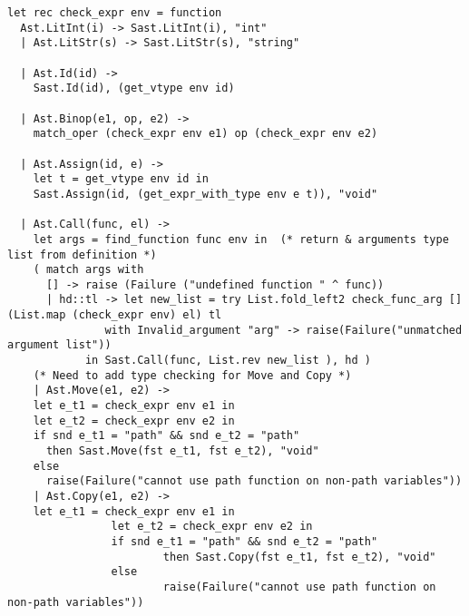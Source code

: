 \documentclass[11pt]{article}
\begin{document}
\begin{listing}[H]
\begin{verbatim}
let rec check_expr env = function
  Ast.LitInt(i) -> Sast.LitInt(i), "int"
  | Ast.LitStr(s) -> Sast.LitStr(s), "string"

  | Ast.Id(id) ->
    Sast.Id(id), (get_vtype env id)

  | Ast.Binop(e1, op, e2) ->
    match_oper (check_expr env e1) op (check_expr env e2)

  | Ast.Assign(id, e) ->
    let t = get_vtype env id in
    Sast.Assign(id, (get_expr_with_type env e t)), "void"

  | Ast.Call(func, el) ->
    let args = find_function func env in  (* return & arguments type list from definition *)
    ( match args with
      [] -> raise (Failure ("undefined function " ^ func))
      | hd::tl -> let new_list = try List.fold_left2 check_func_arg [] (List.map (check_expr env) el) tl
               with Invalid_argument "arg" -> raise(Failure("unmatched argument list"))
            in Sast.Call(func, List.rev new_list ), hd )
    (* Need to add type checking for Move and Copy *)
    | Ast.Move(e1, e2) ->
    let e_t1 = check_expr env e1 in
    let e_t2 = check_expr env e2 in
    if snd e_t1 = "path" && snd e_t2 = "path"
      then Sast.Move(fst e_t1, fst e_t2), "void"
    else
      raise(Failure("cannot use path function on non-path variables"))
    | Ast.Copy(e1, e2) ->
    let e_t1 = check_expr env e1 in
                let e_t2 = check_expr env e2 in
                if snd e_t1 = "path" && snd e_t2 = "path"
                        then Sast.Copy(fst e_t1, fst e_t2), "void"
                else
                        raise(Failure("cannot use path function on non-path variables"))
  \end{verbatim}
\end{listing}
\end{document}
